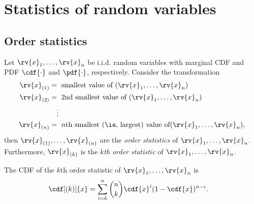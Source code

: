 \section{Statistics of random variables}
\subsection{Order statistics}
\begin{definitionBox}
    Let $\rv{x}_{1},\ldots,\rv{x}_{n}$ be i.i.d. random variables with marginal CDF and PDF $\cdf{\cdot}$ and $\pdf{\cdot}$, respectively. Consider the transformation
    \begin{align}
        \rv{x}_{(1)}&= \text{ smallest value of } (\rv{x}_{1},\ldots,\rv{x}_{n})\\
        \rv{x}_{(2)}&= \text{ 2nd smallest value of } (\rv{x}_{1},\ldots,\rv{x}_{n})\\
        &\quad\vdots\\
        \rv{x}_{(n)}&= \text{ $n$th smallest (\ie, largest) value of} (\rv{x}_{1},\ldots,\rv{x}_{n}),
    \end{align}
    then $\rv{x}_{(1)},\ldots,\rv{x}_{(n)}$ are the \emph{order statistics} of $\rv{x}_{1},\ldots,\rv{x}_{n}$. Furthermore, $\rv{x}_{(k)}$ is the \emph{$k$th order statistic} of $\rv{x}_{1},\ldots,\rv{x}_{n}$.
\end{definitionBox}

\begin{mytheorem}
    The CDF of the $k$th order statistic of $\rv{x}_{1},\ldots,\rv{x}_{n}$ is
    \begin{align}
        \cdf[(k)]{x} &= \sum_{i=k}^{n} \binom{n}{k} \cdf{x}^{i}(1-\cdf{x})^{n-i}.
    \end{align}
\end{mytheorem}

